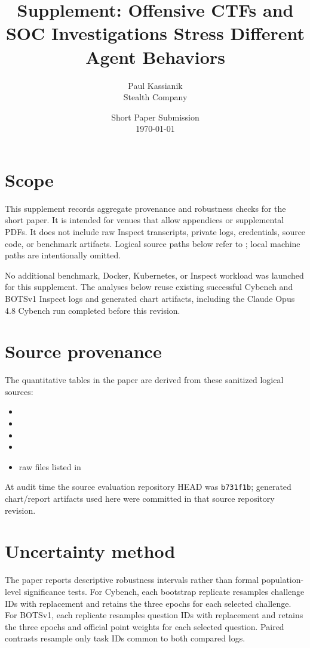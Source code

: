 \documentclass{article}
\title{Supplement: Offensive CTFs and SOC Investigations Stress Different Agent Behaviors}
\author{Paul Kassianik\\Stealth Company}
\date{Short Paper Submission\\\today}
\begin{document}
\maketitle

\section{Scope}

This supplement records aggregate provenance and robustness checks for the short paper.  It is intended for venues that allow appendices or supplemental PDFs.  It does not include raw Inspect transcripts, private logs, credentials, source code, or benchmark artifacts.  Logical source paths below refer to ; local machine paths are intentionally omitted.

No additional benchmark, Docker, Kubernetes, or Inspect workload was launched for this supplement.  The analyses below reuse existing successful Cybench and BOTSv1 Inspect logs and generated chart artifacts, including the Claude Opus 4.8 Cybench run completed before this revision.

\section{Source provenance}

The quantitative tables in the paper are derived from these sanitized logical sources:
\begin{itemize}
  \item {}
  \item {}
  \item {}
  \item {}
  \item raw  files listed in 
\end{itemize}
At audit time the source evaluation repository HEAD was \texttt{b731f1b}; generated chart/report artifacts used here were committed in that source repository revision.

\section{Uncertainty method}

The paper reports descriptive robustness intervals rather than formal population-level significance tests.  For Cybench, each bootstrap replicate resamples challenge IDs with replacement and retains the three epochs for each selected challenge.  For BOTSv1, each replicate resamples question IDs with replacement and retains the three epochs and official point weights for each selected question.  Paired contrasts resample only task IDs common to both compared logs.
\end{document}
